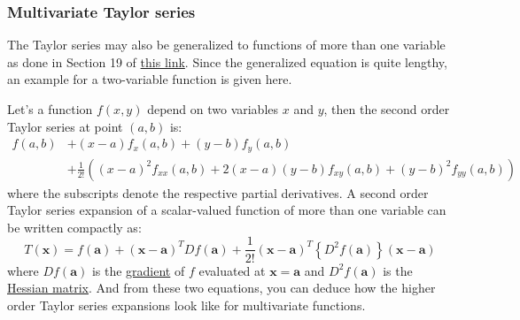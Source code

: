 \subsubsection{Multivariate Taylor series}
The Taylor series may also be generalized to functions of more than one variable as done in Section 19 of \href{https://en.wikipedia.org/wiki/Taylor_series}{this link}. Since the generalized equation is quite lengthy, an example for a two-variable function is given here.

Let's a function $f(x,y)$ depend on two variables $x$ and $y$, then the second order Taylor series at point $(a,b)$ is:
\begin{align}
	f(a,b) &+ (x-a)f_x(a,b) + (y-b)f_y(a,b) \nonumber \\
	       &+ \frac{1}{2!} \left( (x-a)^2 f_{xx}(a,b) + 2(x-a)(y-b) f_{xy}(a,b) + (y-b)^2 f_{yy}(a,b) \right)
\end{align}
where the subscripts denote the respective partial derivatives. A second order Taylor series expansion of a scalar-valued function of more than one variable can be written compactly as:
\begin{equation}
	T(\mathbf{x}) = f(\mathbf{a}) + (\mathbf{x-a})^T D f(\mathbf{a}) + \frac{1}{2!} (\mathbf{x-a})^T \left\{ D^2 f(\mathbf{a}) \right\} (\mathbf{x-a}) 
\end{equation}
where $D f(\mathbf{a})$ is the \href{https://en.wikipedia.org/wiki/Gradient}{gradient} of $f$ evaluated at $\mathbf{x = a}$ and $D^2 f(\mathbf{a})$ is the \href{https://en.wikipedia.org/wiki/Hessian_matrix}{Hessian matrix}. And from these two equations, you can deduce how the higher order Taylor series expansions look like for multivariate functions. 

